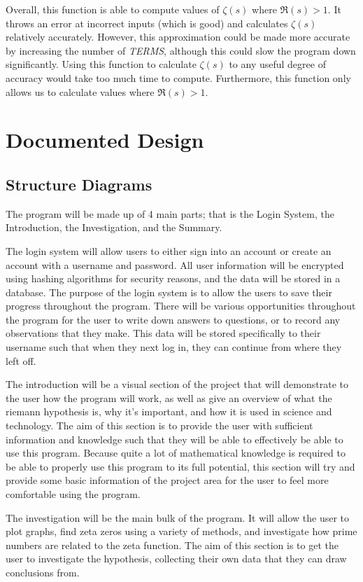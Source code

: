 \documentclass{article}
\begin{document}
Overall, this function is able to compute values of $\zeta(s)$ where $\Re(s) > 1$. It throws an error at incorrect inputs (which is good) and calculates $\zeta(s)$ relatively accurately. However, this approximation could be made more accurate by increasing the number of \textit{TERMS}, although this could slow the program down significantly. Using this function to calculate $\zeta(s)$ to any useful degree of accuracy would take too much time to compute. Furthermore, this function only allows us to calculate values where $\Re(s) > 1$.

\clearpage
\section{Documented Design}

\subsection{Structure Diagrams}

The program will be made up of 4 main parts; that is the Login System, the Introduction, the Investigation, and the Summary.

The login system will allow users to either sign into an account or create an account with a username and password. All user information will be encrypted using hashing algorithms for security reasons, and the data will be stored in a database. The purpose of the login system is to allow the users to save their progress throughout the program. There will be various opportunities throughout the program for the user to write down answers to questions, or to record any observations that they make. This data will be stored specifically to their username such that when they next log in, they can continue from where they left off.

The introduction will be a visual section of the project that will demonstrate to the user how the program will work, as well as give an overview of what the riemann hypothesis is, why it's important, and how it is used in science and technology. The aim of this section is to provide the user with sufficient information and knowledge such that they will be able to effectively be able to use this program. Because quite a lot of mathematical knowledge is required to be able to properly use this program to its full potential, this section will try and provide some basic information of the project area for the user to feel more comfortable using the program.

The investigation will be the main bulk of the program. It will allow the user to plot graphs, find zeta zeros using a variety of methods, and investigate how prime numbers are related to the zeta function. The aim of this section is to get the user to investigate the hypothesis, collecting their own data that they can draw conclusions from.
\end{document}
